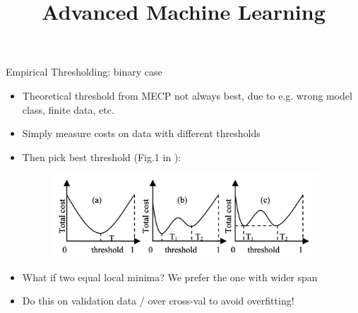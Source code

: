 \documentclass[11pt,compress,t,notes=noshow, xcolor=table]{beamer}
\title{Advanced Machine Learning}
\date{}
\begin{document}



\sloppy



\begin{vbframe}{Empirical Thresholding: binary case}
    \begin{itemize}
        \item Theoretical threshold from MECP not always best, due to e.g. wrong model class, finite data, etc.
        \item Simply measure costs on data with different thresholds
        \item Then pick best threshold (Fig.1 in \href{https://www.aaai.org/Library/AAAI/2006/aaai06-076.php}{}):
        \begin{figure}[h]
            \centering
            \includegraphics[width=0.95\textwidth]{slides/imbalanced-learning/figure/threshold_adjusting.png}
        \end{figure}


        \item What if two equal local minima? We prefer the one with wider span %

        \item Do this on validation data / over cross-val to avoid overfitting!
    \end{itemize}
\end{vbframe}
\end{document}

